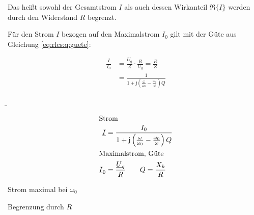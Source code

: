 \begin{frame}
{    Das heißt sowohl der Gesamtstrom $\underline{I}$ als auch dessen Wirkanteil $\Re\{\underline{I}\}$ werden durch den Widerstand $R$ begrenzt.

    Für den Strom $\underline{I}$ bezogen auf den Maximalstrom $I_0$ gilt mit der Güte aus Gleichung \ref{eq:rlcs:q:guete}:

    \begin{equation}\label{eq:rlcs:inorm}
        \begin{aligned}
            \frac{\underline{I}}{I_0} 
            &= \frac{U_q}{\underline{Z}} \cdot \frac{R}{U_q} 
            =  \frac{R}{\underline{Z}}\\
            &= \frac{1}{1 + \mathrm{j} \left(\frac{\omega}{\omega_0} - \frac{\omega_0}{\omega}\right) Q}
        \end{aligned}
    \end{equation}
}
\b{%
    \begin{minipage}{0.3\textwidth}%
    \begin{align}
        \intertext{Strom}
        \underline{I} &= \frac{I_0}{1 + \mathrm{j}\left(\frac{\omega}{\omega_0} - \frac{\omega_0}{\omega}\right)Q}\\
        \intertext{Maximalstrom, Güte}
        \underline{I}_0 &= \frac{\underline{U}_q}{R}
        \qquad Q = \frac{X_k}{R}        
    \end{align}
    \end{minipage}\hfill%
    \begin{minipage}{0.65\textwidth}\centering
        \newline
        Strom maximal bei $\omega_0$

        Begrenzung durch $R$
    \end{minipage}
}
\end{frame}

